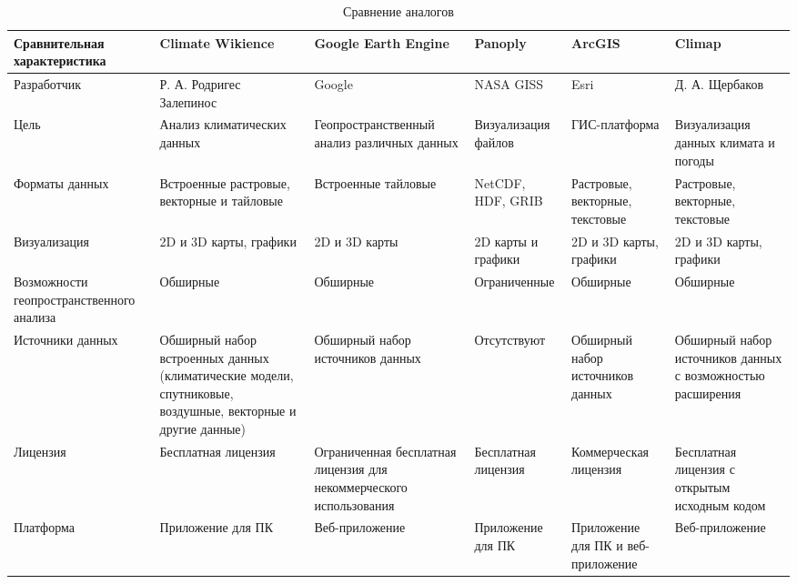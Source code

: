 \documentclass[a4paper, 12pt]{article}
\begin{document}
	\begin{sidewaystable}
		\begin{tabularx}{\textwidth}{|L|L|L|L|L|L|}
			\hline Сравнительная характеристика & Climate Wikience & Google Earth Engine &
			Panoply & ArcGIS & Climap \\
			\hline Разработчик & Р. А. Родригес Залепинос & Google & NASA GISS & Esri & Д. А. Щербаков \\
			\hline Цель & Анализ климатических данных & Геопространственный анализ различных данных &
			Визуализация файлов & ГИС-платформа & Визуализация данных климата и погоды \\
			\hline Форматы данных & Встроенные
			растровые, векторные и тайловые & Встроенные тайловые & NetCDF, HDF, GRIB & Растровые, векторные, текстовые & Растровые,
			векторные, текстовые \\
			\hline Визуализация & 2D и 3D карты, графики & 2D и 3D карты & 2D карты и графики & 2D и
			3D карты, графики & 2D и 3D карты, графики \\
			\hline Возможности геопространственного анализа & Обширные &
			Обширные & Ограниченные & Обширные & Обширные \\
			\hline Источники данных & Обширный набор встроенных данных (климатические
			модели, спутниковые, воздушные, векторные и другие данные) & Обширный набор источников данных & Отсутствуют & Обширный
			набор источников данных & Обширный набор источников данных с возможностью расширения \\
			\hline Лицензия & Бесплатная
			лицензия & Ограниченная бесплатная лицензия для некоммерческого использования & Бесплатная лицензия & Коммерческая
			лицензия & Бесплатная лицензия с открытым исходным кодом \\
			\hline Платформа & Приложение для ПК & Веб-приложение
			& Приложение для ПК & Приложение для ПК и веб-приложение & Веб-приложение \\
			\hline
		\end{tabularx}
		\caption{Сравнение аналогов}
	\end{sidewaystable}
\end{document}
